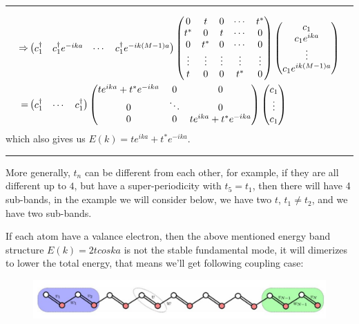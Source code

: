 \documentclass[letterpaper,10pt,english]{sphinxmanual}
\begin{document}
\bigskip\hrule{}\bigskip

\begin{gather}
\begin{split}\Rightarrow &\begin{pmatrix}c_1^\dagger&c_1^\dagger e^{-ika}&\cdots&c_1^\dagger e^{-ik(M-1)a} \end{pmatrix}
\begin{pmatrix} 0 & t &0 & \cdots&t^*\\
t^* &0&t&\cdots&0\\
0&t^*&0&\cdots&0\\
\vdots&\vdots&\vdots&\vdots&\vdots\\
t&0&0&t^*&0
\end{pmatrix}
\begin{pmatrix}c_1\\c_1 e^{ika}\\\vdots\\c_1e^{ik(M-1)a}\end{pmatrix}\\
=&\begin{pmatrix}c_1^\dagger&\cdots&c_1^\dagger \end{pmatrix}
\begin{pmatrix} te^{ika}+t^*e^{-ika} & 0&0\\
0&\ddots&0\\
0&0&te^{ika}+t^*e^{-ika}
\end{pmatrix}
\begin{pmatrix}c_1\\\vdots\\c_1\end{pmatrix}\end{split}\notag
\end{gather}
which also gives us \(E(k)=te^{ika}+t^*e^{-ika}\).


\bigskip\hrule{}\bigskip


More generally, \(t_n\) can be different from each other, for
example, if they are all different up to \(4\), but have a
super-periodicity with \(t_{5}=t_1\), then there will have 4
sub-bands, in the example we will consider below, we have two \(t\),
\(t_1\neq t_2\), and we have two sub-bands.

If each atom have a valance electron, then the above mentioned energy
band structure \(E(k)=2tcoska\) is not the stable fundamental mode,
it will dimerizes to lower the total energy, that means we'll get
following coupling case:
\begin{figure}[htbp]
\centering

\includegraphics[width=0.700\linewidth]{2.jpg}
\end{figure}
\end{document}
